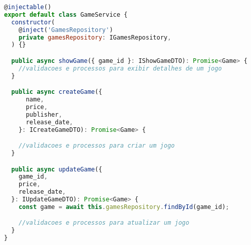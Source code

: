 \begin{lstlisting}[language=JavaScript, caption={Implementação que viola o SRP},captionpos=b, label=alg:gameservice]
@injectable()
export default class GameService {
  constructor(
    @inject('GamesRepository')
    private gamesRepository: IGamesRepository,
  ) {}

  public async showGame({ game_id }: IShowGameDTO): Promise<Game> {
    //validacoes e processos para exibir detalhes de um jogo
  }

  public async createGame({
      name,
      price,
      publisher,
      release_date,
    }: ICreateGameDTO): Promise<Game> {

    //validacoes e processos para criar um jogo
  }

  public async updateGame({
    game_id,
    price,
    release_date,
  }: IUpdateGameDTO): Promise<Game> {
    const game = await this.gamesRepository.findById(game_id);

    //validacoes e processos para atualizar um jogo
  }
}
\end{lstlisting}